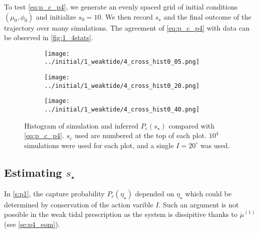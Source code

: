 \documentclass[
        fleqn,
        usenatbib,
    ]{mnras}
\begin{document}
To test \autoref{eq:p_c_p4}, we generate an evenly spaced grid of initial
conditions $(\mu_0, \phi_0)$ and initialize $s_0 = 10$. We then record $s_\star$
and the final outcome of the trajectory over many simulations. The agreement of
\autoref{eq:p_c_p4} with data can be observed in \autoref{fig:1_4stats}.
\begin{figure}
    \centering
    \begin{subfigure}{\columnwidth}
        \centering
        \texttt{[image: ../initial/1\_weaktide/4\_cross\_hist0\_05.png]}
    \end{subfigure}

    \begin{subfigure}{\columnwidth}
        \centering
        \texttt{[image: ../initial/1\_weaktide/4\_cross\_hist0\_20.png]}
    \end{subfigure}

    \begin{subfigure}{\columnwidth}
        \centering
        \texttt{[image: ../initial/1\_weaktide/4\_cross\_hist0\_40.png]}
    \end{subfigure}

    \caption{Histogram of simulation and inferred $P_c(s_\star)$ compared with
    \autoref{eq:p_c_p4}. $s_c$ used are numbered at the top of each plot. $10^4$
    simulations were used for each plot, and a single $I = 20^\circ$ was
    used.}\label{fig:1_4stats}
\end{figure}

\subsection{Estimating $s_\star$}

In \autoref{s:p1}, the capture probability $P_c(\eta_\star)$ depended on
$\eta_\star$ which could be determined by conservation of the action varible
$I$. Such an argument is not possible in the weak tidal prescription as the
system is dissipitive thanks to $\dot{\mu}^{(1)}$ (see \autoref{se:p4_eom}).
\end{document}
